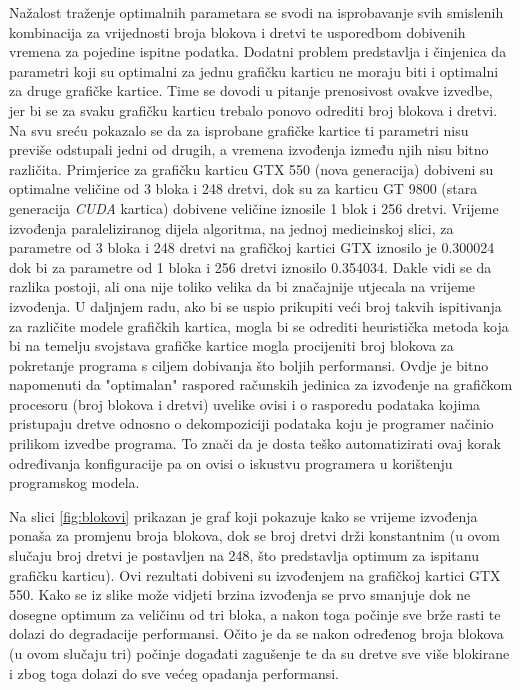 \documentclass[times, utf8, zavrsni, numeric, sort]{fer}
\begin{document}
Nažalost traženje optimalnih parametara se svodi na isprobavanje svih smislenih kombinacija za vrijednosti broja blokova i dretvi te usporedbom dobivenih vremena za pojedine ispitne podatka. Dodatni problem predstavlja i činjenica da parametri koji su optimalni za jednu grafičku karticu ne moraju biti i optimalni za druge grafičke kartice. Time se dovodi u pitanje prenosivost ovakve izvedbe, jer bi se za svaku grafičku karticu trebalo ponovo odrediti broj blokova i dretvi. Na svu sreću pokazalo se  da za isprobane grafičke kartice ti parametri nisu previše odstupali jedni od drugih, a vremena izvođenja između njih nisu bitno različita. Primjerice za grafičku karticu GTX 550 (nova generacija) dobiveni su optimalne veličine od 3 bloka i 248 dretvi, dok su za karticu GT 9800 (stara generacija \emph{CUDA} kartica) dobivene veličine iznosile 1 blok i 256 dretvi. Vrijeme izvođenja paraleliziranog dijela algoritma, na jednoj medicinskoj slici, za parametre od 3 bloka i 248 dretvi na grafičkoj kartici GTX iznosilo je 0.300024 dok bi za parametre od 1 bloka i 256 dretvi iznosilo 0.354034. Dakle vidi se da razlika postoji, ali ona nije toliko velika da bi značajnije utjecala na vrijeme izvođenja. U daljnjem radu, ako bi se uspio prikupiti veći broj takvih ispitivanja za različite modele grafičkih kartica, mogla bi se odrediti heuristička metoda koja bi na temelju svojstava grafičke kartice mogla procijeniti broj blokova za pokretanje programa  s ciljem dobivanja što boljih performansi. Ovdje je bitno napomenuti da "optimalan" raspored računskih jedinica za izvođenje na grafičkom procesoru (broj blokova i dretvi) uvelike ovisi i o rasporedu podataka kojima pristupaju dretve odnosno o dekompoziciji podataka koju je programer načinio prilikom izvedbe programa. To znači da je dosta teško automatizirati ovaj korak određivanja konfiguracije pa on ovisi o iskustvu programera u korištenju programskog modela.

Na slici \ref{fig:blokovi} prikazan je graf koji pokazuje kako se vrijeme izvođenja ponaša za promjenu broja blokova, dok se broj dretvi drži konstantnim (u ovom slučaju broj dretvi je postavljen na 248, što predstavlja optimum za ispitanu grafičku karticu). Ovi rezultati dobiveni su izvođenjem na grafičkoj kartici GTX 550. Kako se iz slike može vidjeti brzina izvođenja se prvo smanjuje dok ne dosegne optimum za veličinu od tri bloka, a nakon toga počinje sve brže rasti te dolazi do degradacije performansi. Očito je da se nakon određenog broja blokova (u ovom slučaju tri) počinje događati zagušenje te da su dretve sve više blokirane i zbog toga dolazi do sve većeg opadanja performansi.
\end{document}

